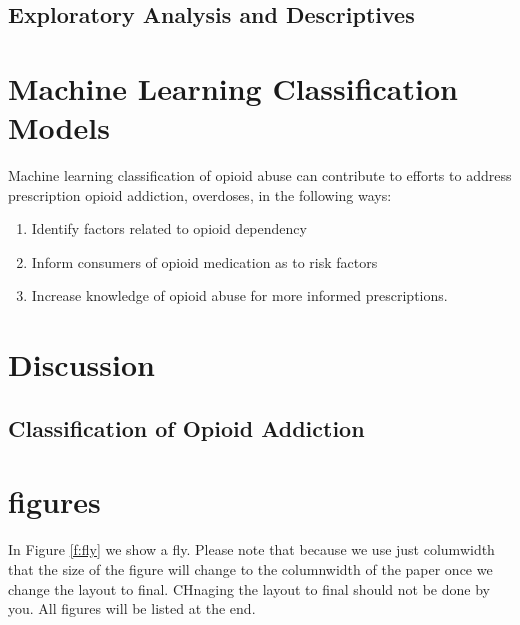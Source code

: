 \documentclass[sigconf]{acmart}
\begin{document}
\subsection{Exploratory Analysis and Descriptives}

\cite{rahm00}


\cite{mckinney17}



\section{Machine Learning Classification Models}

\cite{muller17}


\cite{raschka17}

Machine learning classification 
of opioid abuse can contribute to efforts to address prescription opioid 
addiction, overdoses, in the following ways: 
\begin{enumerate}
\item Identify factors related to opioid dependency
\item Inform consumers of opioid medication as to risk factors 
\item Increase knowledge of opioid abuse for more informed prescriptions. 
\end{enumerate}


\cite{vanderplas17}


\section{Discussion}

\subsection{Classification of Opioid Addiction}










\section{figures}

In Figure \ref{f:fly} we show a fly. Please note that because we use
just columwidth that the size of the figure will change to the
columnwidth of the paper once we change the layout to final. CHnaging
the layout to final should not be done by you. All figures will be
listed at the end.
\end{document}
